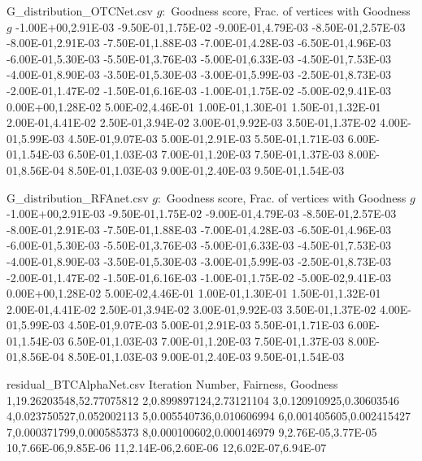   \begin{filecontents*}{G_distribution_OTCNet.csv}
  $g:$ Goodness score, Frac. of vertices with Goodness $g$
  -1.00E+00,2.91E-03
  -9.50E-01,1.75E-02
  -9.00E-01,4.79E-03
  -8.50E-01,2.57E-03
  -8.00E-01,2.91E-03
  -7.50E-01,1.88E-03
  -7.00E-01,4.28E-03
  -6.50E-01,4.96E-03
  -6.00E-01,5.30E-03
  -5.50E-01,3.76E-03
  -5.00E-01,6.33E-03
  -4.50E-01,7.53E-03
  -4.00E-01,8.90E-03
  -3.50E-01,5.30E-03
  -3.00E-01,5.99E-03
  -2.50E-01,8.73E-03
  -2.00E-01,1.47E-02
  -1.50E-01,6.16E-03
  -1.00E-01,1.75E-02
  -5.00E-02,9.41E-03
  0.00E+00,1.28E-02
  5.00E-02,4.46E-01
  1.00E-01,1.30E-01
  1.50E-01,1.32E-01
  2.00E-01,4.41E-02
  2.50E-01,3.94E-02
  3.00E-01,9.92E-03
  3.50E-01,1.37E-02
  4.00E-01,5.99E-03
  4.50E-01,9.07E-03
  5.00E-01,2.91E-03
  5.50E-01,1.71E-03
  6.00E-01,1.54E-03
  6.50E-01,1.03E-03
  7.00E-01,1.20E-03
  7.50E-01,1.37E-03
  8.00E-01,8.56E-04
  8.50E-01,1.03E-03
  9.00E-01,2.40E-03
  9.50E-01,1.54E-03
  \end{filecontents*}
  
  \begin{filecontents*}{G_distribution_RFAnet.csv}
  $g:$ Goodness score, Frac. of vertices with Goodness $g$
  -1.00E+00,2.91E-03
  -9.50E-01,1.75E-02
  -9.00E-01,4.79E-03
  -8.50E-01,2.57E-03
  -8.00E-01,2.91E-03
  -7.50E-01,1.88E-03
  -7.00E-01,4.28E-03
  -6.50E-01,4.96E-03
  -6.00E-01,5.30E-03
  -5.50E-01,3.76E-03
  -5.00E-01,6.33E-03
  -4.50E-01,7.53E-03
  -4.00E-01,8.90E-03
  -3.50E-01,5.30E-03
  -3.00E-01,5.99E-03
  -2.50E-01,8.73E-03
  -2.00E-01,1.47E-02
  -1.50E-01,6.16E-03
  -1.00E-01,1.75E-02
  -5.00E-02,9.41E-03
  0.00E+00,1.28E-02
  5.00E-02,4.46E-01
  1.00E-01,1.30E-01
  1.50E-01,1.32E-01
  2.00E-01,4.41E-02
  2.50E-01,3.94E-02
  3.00E-01,9.92E-03
  3.50E-01,1.37E-02
  4.00E-01,5.99E-03
  4.50E-01,9.07E-03
  5.00E-01,2.91E-03
  5.50E-01,1.71E-03
  6.00E-01,1.54E-03
  6.50E-01,1.03E-03
  7.00E-01,1.20E-03
  7.50E-01,1.37E-03
  8.00E-01,8.56E-04
  8.50E-01,1.03E-03
  9.00E-01,2.40E-03
  9.50E-01,1.54E-03
  \end{filecontents*}
  
  \begin{filecontents*}{residual_BTCAlphaNet.csv}
  Iteration Number, Fairness, Goodness
  1,19.26203548,52.77075812
  2,0.899897124,2.73121104
  3,0.120910925,0.30603546
  4,0.023750527,0.052002113
  5,0.005540736,0.010606994
  6,0.001405605,0.002415427
  7,0.000371799,0.000585373
  8,0.000100602,0.000146979
  9,2.76E-05,3.77E-05
  10,7.66E-06,9.85E-06
  11,2.14E-06,2.60E-06
  12,6.02E-07,6.94E-07
  \end{filecontents*}
  
